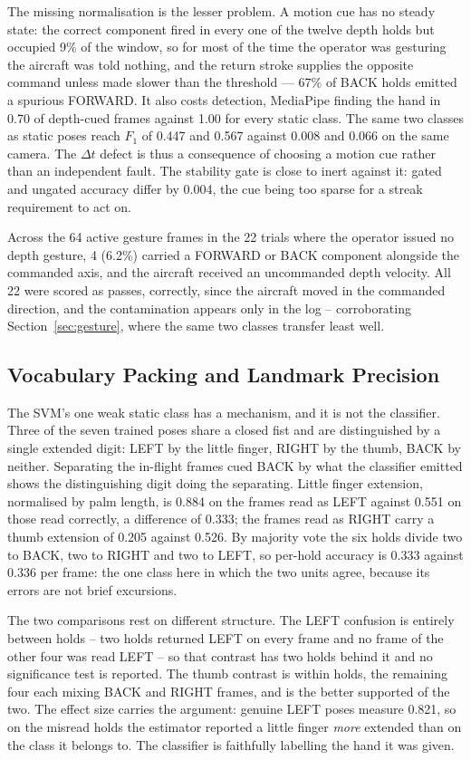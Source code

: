 \documentclass[conference]{IEEEtran}
\begin{document}
The missing normalisation is the lesser problem. A motion cue has no steady
state: the correct component fired in every one of the twelve depth holds but
occupied 9\% of the window, so for most of the time the operator was gesturing
the aircraft was told nothing, and the return stroke supplies the opposite
command unless made slower than the threshold --- 67\% of BACK holds emitted a
spurious FORWARD. It also costs detection, MediaPipe finding the hand in 0.70 of
depth-cued frames against 1.00 for every static class. The same two classes as
static poses reach $F_1$ of 0.447 and 0.567 against 0.008 and 0.066 on the same
camera. The $\Delta t$ defect is thus a consequence of choosing a motion cue
rather than an independent fault. The stability gate is close to inert against
it: gated and ungated accuracy differ by 0.004, the cue being too sparse for a
streak requirement to act on.

Across the 64 active gesture frames in the 22 trials where the operator issued
no depth gesture, 4 (6.2\%) carried a FORWARD or BACK component alongside the
commanded axis, and the aircraft received an uncommanded depth velocity. All 22
were scored as passes, correctly, since the aircraft moved in the commanded
direction, and the contamination appears only in the log -- corroborating
Section~\ref{sec:gesture}, where the same two classes transfer least well.

\subsection{Vocabulary Packing and Landmark Precision}
\label{sec:packing}

The SVM's one weak static class has a mechanism, and it is not the classifier.
Three of the seven trained poses share a closed fist and are distinguished by a
single extended digit: LEFT by the little finger, RIGHT by the thumb, BACK by
neither. Separating the in-flight frames cued BACK by what the classifier emitted shows
the distinguishing digit doing the separating. Little finger extension,
normalised by palm length, is 0.884 on the frames read as LEFT
against 0.551 on those read correctly, a difference of 0.333; the frames read as
RIGHT carry a thumb extension of 0.205 against 0.526. By majority vote the six
holds divide two to BACK, two to RIGHT and two to LEFT, so per-hold accuracy is
0.333 against 0.336 per frame: the one class here in which the two units agree,
because its errors are not brief excursions.

The two comparisons rest on different structure. The LEFT confusion is entirely
between holds -- two holds returned LEFT on every frame and no frame of the
other four was read LEFT -- so that contrast has two holds behind it and no
significance test is reported. The thumb contrast is within holds, the remaining
four each mixing BACK and RIGHT frames, and is the better supported of the two.
The effect size carries the argument: genuine LEFT poses measure 0.821, so on
the misread holds the estimator reported a little finger \emph{more} extended
than on the class it belongs to. The classifier is faithfully labelling the hand
it was given.
\end{document}
